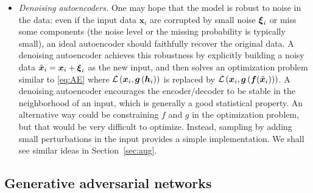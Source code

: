 \begin{itemize}
\item \emph{Denoising autoencoders. } One may hope that the model is robust to noise in the data: even if the input data $\bm{x}_i$ are corrupted by small noise $\text{\boldmath $\xi$}_i$ or miss some components (the noise level or the missing probability is typically small), an ideal autoencoder should faithfully recover the original data. A denoising autoencoder \citep{vincent2008extracting} achieves this robustness by explicitly building a noisy data $\tilde{\bm{x}}_{i} = \bm{x}_i + \text{\boldmath $\xi$}_i$ as the new input, and then solves an optimization problem similar to \eqref{eq:AE} where $\mathcal{L}\left(\bm{x}_{i},\text{\boldmath $g$}\left(\bm{h}_{i}\right)\right)$ is replaced by $\mathcal{L}\left(\bm{x}_{i},\text{\boldmath $g$}\left(\text{\boldmath $f$}(\tilde{\bm{x}}_{i})\right)\right)$. A denoising autoencoder encourages the encoder/decoder to be stable in the neighborhood of an input, which is generally a good statistical property. An alternative way could be constraining $f$ and $g$ in the optimization problem, but that would be very difficult to optimize. Instead, sampling by adding small perturbations in the input provides a simple implementation. We shall see similar ideas in Section~\ref{sec:aug}.


\end{itemize}

\subsection{Generative adversarial networks}

